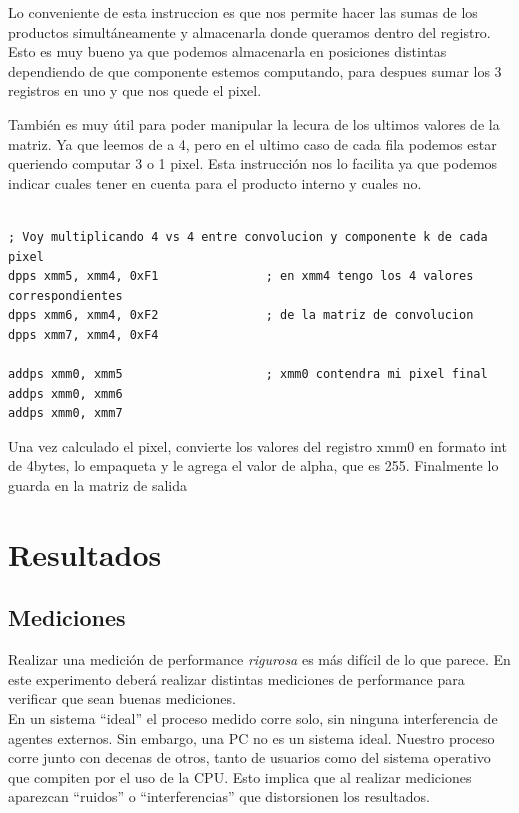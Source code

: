 \documentclass[10pt,a4paper,spanish]{article}
\begin{document}
Lo conveniente de esta instruccion es que nos permite hacer las sumas de los productos simultáneamente y almacenarla donde queramos dentro del registro. Esto es muy bueno ya que podemos almacenarla en posiciones distintas dependiendo de que componente estemos computando, para despues sumar los 3 registros en uno y que nos quede el pixel.

También es muy útil para poder manipular la lecura de los ultimos valores de la matriz. Ya que leemos de a 4, pero en el ultimo caso de cada fila podemos estar queriendo computar 3 o 1 pixel. Esta instrucción nos lo facilita ya que podemos indicar cuales tener en cuenta para el producto interno y cuales no. \\

\begin{codesnippet}
\begin{verbatim}

; Voy multiplicando 4 vs 4 entre convolucion y componente k de cada pixel
dpps xmm5, xmm4, 0xF1               ; en xmm4 tengo los 4 valores correspondientes
dpps xmm6, xmm4, 0xF2               ; de la matriz de convolucion
dpps xmm7, xmm4, 0xF4

addps xmm0, xmm5                    ; xmm0 contendra mi pixel final
addps xmm0, xmm6
addps xmm0, xmm7

\end{verbatim}
\end{codesnippet}

Una vez calculado el pixel, convierte los valores del registro xmm0 en formato int de 4bytes, lo empaqueta y le agrega el valor de alpha, que es 255. Finalmente lo guarda en la matriz de salida

\section{Resultados}

\subsection{Mediciones}

Realizar una medición de performance \emph{rigurosa} es más difícil de lo que parece. En este experimento deberá realizar distintas mediciones de performance para verificar que sean buenas mediciones. \\

En un sistema ``ideal'' el proceso medido corre solo, sin ninguna interferencia de agentes externos. Sin embargo, una PC no es un sistema ideal. Nuestro proceso corre junto con decenas de otros, tanto de usuarios como del sistema operativo que compiten por el uso de la CPU. Esto implica que al realizar mediciones aparezcan ``ruidos'' o ``interferencias'' que distorsionen los resultados. \\
\end{document}
